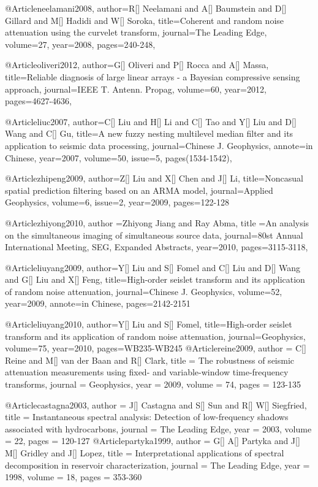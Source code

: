 @Article{neelamani2008,
author={R[] Neelamani and A[] Baumstein and D[] Gillard and M[] Hadidi and W[] Soroka},
title={Coherent and random noise attenuation using the curvelet transform},
journal={The Leading Edge},
volume=27,
year=2008,
pages={240-248},
}

@Article{oliveri2012,
author={G[] Oliveri and P[] Rocca and A[] Massa},
title={Reliable diagnosis of large linear arrays - a Bayesian compressive sensing approach},
journal={IEEE T. Antenn. Propag},
volume=60,
year=2012,
pages={4627-4636},
}


@Article{liuc2007,
author={C[] Liu and H[] Li and C[] Tao and Y[] Liu and D[] Wang and C[] Gu},
title={A new fuzzy nesting multilevel median filter and its application to seismic data processing},
journal={Chinese J. Geophysics},
annote={in Chinese},
year=2007,
volume=50,
issue=5,
pages(1534-1542),
}

@Article{zhipeng2009,
author={Z[] Liu and X[] Chen and J[] Li},
title={Noncasual spatial prediction filtering based on an ARMA model},
journal={Applied Geophysics},
volume=6,
issue=2,
year=2009,
pages={122-128}
}

@Article{zhiyong2010,
  author ={Zhiyong Jiang and Ray Abma},
  title ={An analysis on the simultaneous imaging of simultaneous source data},
  journal={80st Annual International Meeting, SEG, Expanded Abstracts},
  year=2010,
  pages={3115-3118},
}

@Article{liuyang2009,
author={Y[] Liu and S[] Fomel and C[] Liu and D[] Wang and G[] Liu and X[] Feng},
title={High-order seislet transform and its application of random noise attenuation},
journal={Chinese J. Geophysics},
volume=52,
year=2009,
annote={in Chinese},
pages={2142-2151}
}

@Article{liuyang2010,
author={Y[] Liu and S[] Fomel},
title={High-order seislet transform and its application of random noise attenuation},
journal={Geophysics},
volume=75,
year=2010,
pages={WB235-WB245}
}
@Article{reine2009,
  author = 	 {C[] Reine and M[] van der Baan and R[] Clark},
  title = 	 {The robustness of seismic attenuation measurements using fixed- and variable-window time-frequency transforms},
  journal = 	 {Geophysics},
  year = 	 2009,
  volume = 	 74,
  pages = 	 {123-135}
}


@Article{castagna2003,
  author = 	 {J[] Castagna and S[] Sun and R[] W[] Siegfried},
  title = 	 {Instantaneous spectral analysis: Detection of low-frequency shadows associated with hydrocarbons},
  journal = 	 {The Leading Edge},
  year = 	 2003,
  volume = 	 22,
  pages = 	 {120-127}
}
@Article{partyka1999,
  author = 	 {G[] A[] Partyka and J[] M[] Gridley and J[] Lopez},
  title = 	 {Interpretational applications of spectral decomposition in reservoir characterization},
  journal = 	 {The Leading Edge},
  year = 	 1998,
  volume = 	 18,
  pages = 	 {353-360}
}


